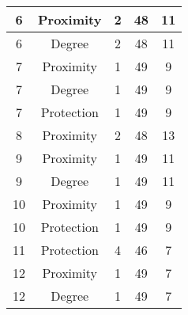 \documentclass[results.tex]{subfiles}
\begin{document}
\begin{center}
\begin{tabular}{| c || c | c | c | c |}
            \hline
            6                       & Proximity                    & 2                      & 48                      & 11                   \\
            \hline
            6                       & Degree                       & 2                      & 48                      & 11                   \\
            \hline
            7                       & Proximity                    & 1                      & 49                      & 9                    \\
            \hline
            7                       & Degree                       & 1                      & 49                      & 9                    \\
            \hline
            7                       & Protection                   & 1                      & 49                      & 9                    \\
            \hline
            8                       & Proximity                    & 2                      & 48                      & 13                   \\
            \hline
            9                       & Proximity                    & 1                      & 49                      & 11                   \\
            \hline
            9                       & Degree                       & 1                      & 49                      & 11                   \\
            \hline
            10                      & Proximity                    & 1                      & 49                      & 9                    \\
            \hline
            10                      & Protection                   & 1                      & 49                      & 9                    \\
            \hline
            11                      & Protection                   & 4                      & 46                      & 7                    \\
            \hline
            12                      & Proximity                    & 1                      & 49                      & 7                    \\
            \hline
            12                      & Degree                       & 1                      & 49                      & 7                    \\

\end{tabular}
\end{center}
\end{document}
